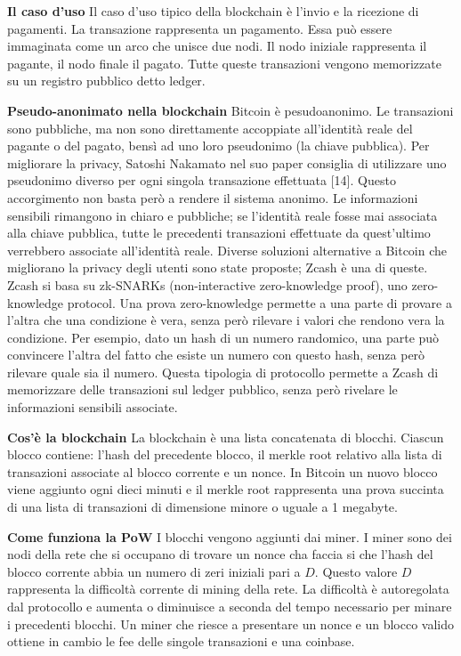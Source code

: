 \documentclass[12pt,italian,]{book}
\begin{document}
\textbf{\textbf{Il caso d'uso}} Il caso d'uso tipico della blockchain è l'invio e la ricezione di pagamenti. La transazione rappresenta un pagamento. Essa può essere immaginata come un arco che unisce due nodi. Il nodo iniziale rappresenta il pagante, il nodo finale il pagato. Tutte queste transazioni vengono memorizzate su un registro pubblico detto ledger.

\textbf{\textbf{Pseudo-anonimato nella blockchain}} Bitcoin è pesudoanonimo. Le transazioni sono pubbliche, ma non sono direttamente accoppiate all'identità reale del pagante o del pagato, bensì ad uno loro pseudonimo (la chiave pubblica). Per migliorare la privacy, Satoshi Nakamato nel suo paper consiglia di utilizzare uno pseudonimo diverso per ogni singola transazione effettuata {[}14{]}. Questo accorgimento non basta però a rendere il sistema anonimo. Le informazioni sensibili rimangono in chiaro e pubbliche; se l'identità reale fosse mai associata alla chiave pubblica, tutte le precedenti transazioni effettuate da quest'ultimo verrebbero associate all'identità reale. Diverse soluzioni alternative a Bitcoin che migliorano la privacy degli utenti sono state proposte; Zcash è una di queste. Zcash si basa su zk-SNARKs (non-interactive zero-knowledge proof), uno zero-knowledge protocol. Una prova zero-knowledge permette a una parte di provare a l'altra che una condizione è vera, senza però rilevare i valori che rendono vera la condizione. Per esempio, dato un hash di un numero randomico, una parte può convincere l'altra del fatto che esiste un numero con questo hash, senza però rilevare quale sia il numero. Questa tipologia di protocollo permette a Zcash di memorizzare delle transazioni sul ledger pubblico, senza però rivelare le informazioni sensibili associate.

\textbf{\textbf{Cos'è la blockchain}} La blockchain è una lista concatenata di blocchi. Ciascun blocco contiene: l'hash del precedente blocco, il merkle root relativo alla lista di transazioni associate al blocco corrente e un nonce. In Bitcoin un nuovo blocco viene aggiunto ogni dieci minuti e il merkle root rappresenta una prova succinta di una lista di transazioni di dimensione minore o uguale a 1 megabyte.

\textbf{\textbf{Come funziona la PoW}} I blocchi vengono aggiunti dai miner. I miner sono dei nodi della rete che si occupano di trovare un nonce cha faccia si che l'hash del blocco corrente abbia un numero di zeri iniziali pari a \(D\). Questo valore \(D\) rappresenta la difficoltà corrente di mining della rete. La difficoltà è autoregolata dal protocollo e aumenta o diminuisce a seconda del tempo necessario per minare i precedenti blocchi. Un miner che riesce a presentare un nonce e un blocco valido ottiene in cambio le fee delle singole transazioni e una coinbase.
\end{document}
